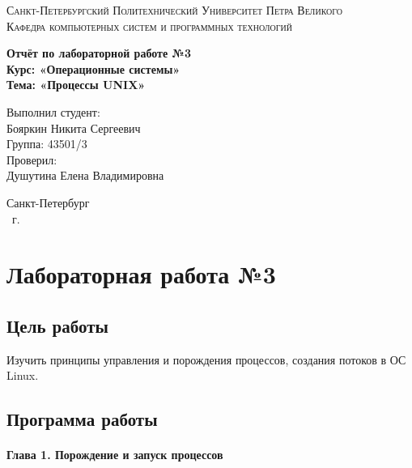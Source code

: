 \documentclass[14pt,a4paper,report]{report}
\begin{document}
\def\contentsname{Содержание}

\begin{titlepage}
	\begin{center}
		\textsc{Санкт-Петербургский Политехнический 
			Университет Петра Великого\\[5mm]
			Кафедра компьютерных систем и программных технологий}
		
		\vfill
		
		\textbf{Отчёт по лабораторной работе №3\\[3mm]
			Курс: «Операционные системы»\\[6mm]
			Тема: «Процессы UNIX»\\[35mm]
		}
	\end{center}
	
	\hfill
	\begin{minipage}{.5\textwidth}
		Выполнил студент:\\[2mm] 
		Бояркин Никита Сергеевич\\
		Группа: 43501/3\\[5mm]
		
		Проверил:\\[2mm] 
		Душутина Елена Владимировна
	\end{minipage}
	\vfill
	\begin{center}
		Санкт-Петербург\\ \the\year\ г.
	\end{center}
\end{titlepage}

\tableofcontents
\clearpage

\chapter{Лабораторная работа №3}

\section{Цель работы}

Изучить принципы управления и порождения процессов, создания потоков в ОС Linux.

\section{Программа работы}

\subsubsection{Глава 1. Порождение и запуск процессов}
\end{document}
